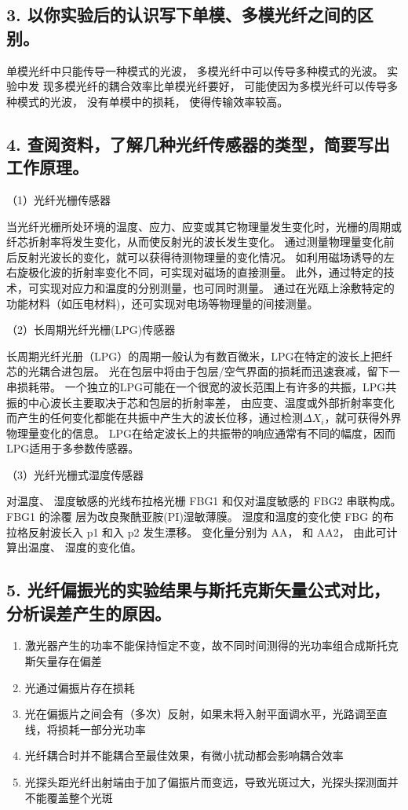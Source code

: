 \documentclass[10pt,a4paper,twoside,UTF8]{ctexart}
\begin{document}
\subsection*{3. 以你实验后的认识写下单模、多模光纤之间的区别。}
单模光纤中只能传导一种模式的光波， 多模光纤中可以传导多种模式的光波。 实验中发
现多模光纤的耦合效率比单模光纤要好， 可能使因为多模光纤可以传导多种模式的光波，
没有单模中的损耗， 使得传输效率较高。

\subsection*{4. 查阅资料，了解几种光纤传感器的类型，简要写出工作原理。}
（1）光纤光栅传感器

当光纤光栅所处环境的温度、应力、应变或其它物理量发生变化时，光栅的周期或纤芯折射率将发生变化，从而使反射光的波长发生变化。
通过测量物理量变化前后反射光波长的变化，就可以获得待测物理量的变化情况。
如利用磁场诱导的左右旋极化波的折射率变化不同，可实现对磁场的直接测量。
此外，通过特定的技术，可实现对应力和温度的分别测量，也可同时测量。
通过在光瓯上涂敷特定的功能材料（如压电材料)，还可实现对电场等物理量的间接测量。

（2）长周期光纤光栅(LPG)传感器

长周期光纤光册（LPG）的周期一般认为有数百微米，LPG在特定的波长上把纤芯的光耦合进包层。
光在包层中将由于包层/空气界面的损耗而迅速衰减，留下一串损耗带。
一个独立的LPG可能在一个很宽的波长范围上有许多的共振，LPG共振的中心波长主要取决于芯和包层的折射率差，
由应变、温度或外部折射率变化而产生的任何变化都能在共振中产生大的波长位移，通过检测$\varDelta X_i$，就可获得外界物理量变化的信息。
LPG在给定波长上的共振带的响应通常有不同的幅度，因而LPG适用于多参数传感器。

（3）光纤光栅式湿度传感器

对温度、 湿度敏感的光线布拉格光栅 FBG1 和仅对温度敏感的 FBG2 串联构成。 FBG1 的涂覆
层为改良聚酰亚胺(PI)湿敏薄膜。 湿度和温度的变化使 FBG 的布拉格反射波长入 p1 和入
p2 发生漂移。 变化量分别为 AA， 和 AA2， 由此可计算出温度、 湿度的变化值。



\subsection*{5. 光纤偏振光的实验结果与斯托克斯矢量公式对比，分析误差产生的原因。}
\begin{enumerate}
	\item 激光器产生的功率不能保持恒定不变，故不同时间测得的光功率组合成斯托克斯矢量存在偏差
	\item 光通过偏振片存在损耗
	\item 光在偏振片之间会有（多次）反射，如果未将入射平面调水平，光路调至直线，将损耗一部分光功率
	\item 光纤耦合时并不能耦合至最佳效果，有微小扰动都会影响耦合效率
	\item 光探头距光纤出射端由于加了偏振片而变远，导致光斑过大，光探头探测面并不能覆盖整个光斑 
\end{enumerate}
\end{document}
